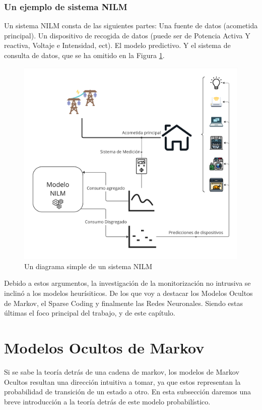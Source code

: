 \subsubsection{Un ejemplo de sistema NILM}
Un sistema NILM consta de las siguientes partes: Una fuente de datos (acometida principal). Un dispositivo de recogida de datos (puede ser de Potencia Activa Y reactiva, Voltaje e Intensidad, ect). El modelo predictivo. Y el sistema de consulta de datos, que se ha omitido en la Figura \ref{diagramaNILM}.
\begin{figure}
    \centering
    \includegraphics[width=450px]{images/SistemaNILM.pdf}
    \caption{Un diagrama simple de un sistema NILM}
    \label{diagramaNILM}
\end{figure}

Debido a estos argumentos, la investigación de la monitorización no intrusiva se inclinó a los modelos heurísiticos. De los que voy a destacar los Modelos Ocultos de Markov, el Sparse Coding y finalmente las Redes Neuronales. Siendo estas últimas el foco principal del trabajo, y de este capítulo. 

\section{Modelos Ocultos de Markov}
Si se sabe la teoría detrás de una cadena de markov, los modelos de Markov Ocultos resultan una dirección intuitiva a tomar, ya que estos representan la probabilidad de transición de un estado a otro. En esta subsección daremos una breve introducción a la teoría detrás de este modelo probabilístico.
